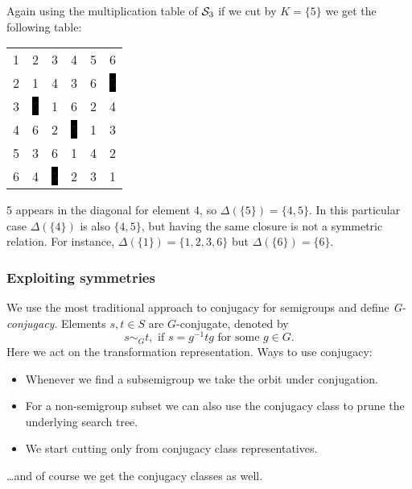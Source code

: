 \documentclass{beamer}
\newcommand{\cS}{{\cal S}}
\newcommand{\jump}{\vskip6pt}
\begin{document}
\begin{frame}
Again using the multiplication table of $\cS_3$ if we cut by $K=\{5\}$ we get the following table:
\begin{center}
\begin{tabular}{@{}c@{}c@{}c@{}c@{}c@{}c@{}}
1&2&3&4&\color{lgr}5&6\\
2&1&4&3&\color{lgr}6&\color{white}\colorbox{black}{5}\\
3&\color{white}\colorbox{black}{5}&1&6&\color{lgr}2&4\\
4&6&2&\color{white}\colorbox{black}{5}&\color{lgr}1&3\\
\color{lgr}5&\color{lgr}3&\color{lgr}6&\color{lgr}1&\color{lgr}4&\color{lgr}2\\
6&4&\color{white}\colorbox{black}{5}&2&\color{lgr}3&1\\
\end{tabular}
\end{center}
5 appears in the diagonal for element 4, so $\Delta(\{5\})=\{4,5\}$. In this particular case $\Delta(\{4\})$ is also $\{4,5\}$, but having the same closure is not a symmetric relation. For instance, $\Delta(\{1\})=\{1,2,3,6\}$ but $\Delta(\{6\})=\{6\}$. 

\end{frame}

\begin{frame}\frametitle{Exploiting symmetries}
We use the most traditional approach to conjugacy for semigroups  and define \emph{G-conjugacy}. Elements $s,t\in S$ are $G$-conjugate, denoted by
$$s\sim_G t, \text{ if } s=g^{-1}tg \text{ for some } g\in G.$$ 
\jump
Here we act on the transformation representation.
\jump
Ways to use conjugacy:
\begin{itemize}
\item Whenever we find a subsemigroup we take the orbit under conjugation.
\item For a non-semigroup subset we can also use the conjugacy class to prune the underlying search tree. 
\item We start cutting only from conjugacy class representatives.
\end{itemize}
\ldots and of course we get the conjugacy classes as well.
\end{frame}
\end{document}
